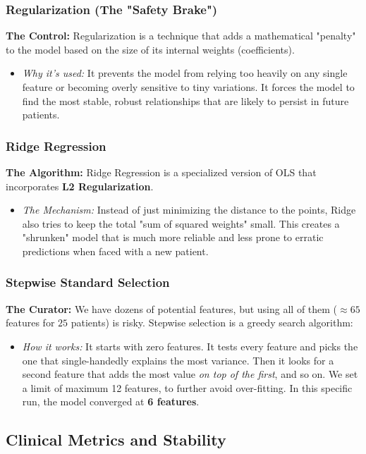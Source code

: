 \documentclass[11pt,a4paper]{article}
\begin{document}
\subsubsection{Regularization (The "Safety Brake")}
\textbf{The Control:} Regularization is a technique that adds a mathematical "penalty" to the model based on the size of its internal weights (coefficients). 
\begin{itemize}
    \item \textit{Why it's used:} It prevents the model from relying too heavily on any single feature or becoming overly sensitive to tiny variations. It forces the model to find the most stable, robust relationships that are likely to persist in future patients.
\end{itemize}

\subsubsection{Ridge Regression}
\textbf{The Algorithm:} Ridge Regression is a specialized version of OLS that incorporates \textbf{L2 Regularization}. 
\begin{itemize}
    \item \textit{The Mechanism:} Instead of just minimizing the distance to the points, Ridge also tries to keep the total "sum of squared weights" small. This creates a "shrunken" model that is much more reliable and less prone to erratic predictions when faced with a new patient.
\end{itemize}

\subsubsection{Stepwise Standard Selection}
\textbf{The Curator:} We have dozens of potential features, but using all of them ($\approx 65$ features for $25$ patients) is risky. Stepwise selection is a greedy search algorithm:
\begin{itemize}
     \item \textit{How it works:} It starts with zero features. It tests every feature and picks the one that single-handedly explains the most variance. Then it looks for a second feature that adds the most value \textit{on top of the first}, and so on. We set a limit of maximum 12 features, to further avoid over-fitting. In this specific run, the model converged at \textbf{6 features}.
\end{itemize}

\subsection{Clinical Metrics and Stability}
\end{document}
